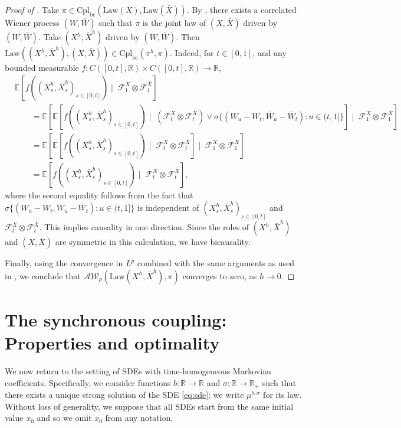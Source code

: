 \documentclass[oneside]{amsart}
\theoremstyle{definition}
\newcommand{\F}{\mathcal F}
\newcommand{\AW}{\mathcal A\mathcal W}
\newcommand{\Law}{\mathrm{Law}}
\newcommand{\R}{\mathbb R}
\newcommand{\cpl}{\mathrm{Cpl}}
\newcommand{\cplba}{\cpl_{\mathrm{bc}}}
\def\E{{\mathbb E}}
\def\R{{\mathbb R}}
\numberwithin{equation}{section}
\begin{document}
\begin{proof}[Proof of ]
	Take $\pi \in \cplba(\Law(X), \Law(\bar X))$. By , there exists a correlated Wiener process $(W, \bar{W})$ such that $\pi$ is the joint law of $(X, \bar{X})$ driven by $(W, \bar W)$. Take $(X^h, \bar X^h)$ driven by $(W, \bar W)$. Then $\Law((X^{h}, \bar{X}^{h}), (X, \bar{X})) \in \cplba(\pi^h, \pi)$. Indeed, for $t \in [0, 1]$, and any bounded measurable $f\colon C([0, t], \R) \times C([0, t], \R) \to \R$,
	\begin{equation}
		\begin{split}
			&\E \!\left[f((X^h_s, \bar X^h_s)_{s \in [0, t]}) \mid \; \F^X_1 \otimes \F^{\bar X}_1 \right]\\
			& \qquad  = \E \!\left[ \E\!\left[f((X^h_s, \bar X^h_s)_{s \in [0, t]}) \mid \; (\F^X_t \otimes \F^{\bar X}_t) \vee \sigma\{(W_u - W_t, \bar W_u - \bar W_t) \colon u \in (t, 1]\}\right] \mid \; \F^X_1 \otimes \F^{\bar X}_1 \right]\\
			& \qquad = \E \!\left[ \E\!\left[f((X^h_s, \bar X^h_s)_{s \in [0, t]}) \mid \; \F^X_t \otimes \F^{\bar X}_t \right] \mid \; \F^X_1 \otimes \F^{\bar X}_1 \right]\\
			& \qquad = \E\!\left[f((X^h_s, \bar X^h_s)_{s \in [0, t]}) \mid \; \F^X_t \otimes \F^{\bar X}_t \right],
		\end{split}	
	\end{equation}
	where the second equality follows from the fact that $\sigma\{(W_u - W_t, \bar W_u - \bar W_t) \colon u \in (t, 1]\}$ is independent of $(X^h_s, \bar X^h_s)_{s \in [0, t]}$ and $\F^X_t \otimes \F^{\bar X}_t$. This implies causality in one direction. Since the roles of $(X^h, \bar X^h)$ and $(X, \bar X)$ are symmetric in this calculation, we have bicausality.
	
	Finally, using the convergence in $L^p$ combined with the same arguments as used in , we conclude that $\AW_p(\Law(X^{h}, \bar{X}^{h}), \pi)$ converges to zero, as $h\to 0$. 
\end{proof}




\section{The synchronous coupling: Properties and optimality}\label{sec:proofs}

We now return to the setting of SDEs with time-homogeneous Markovian coefficients. Specifically, we consider functions $b\colon \R \to \R$ and $\sigma \colon \R \to \R_+$ such that there exists a unique strong solution of the SDE \eqref{eq:sde}; we write $\mu^{b, \sigma}$ for its law. Without loss of generality, we suppose that all SDEs start from the same initial value $x_0$ and so we omit $x_0$ from any notation. 
\end{document}

